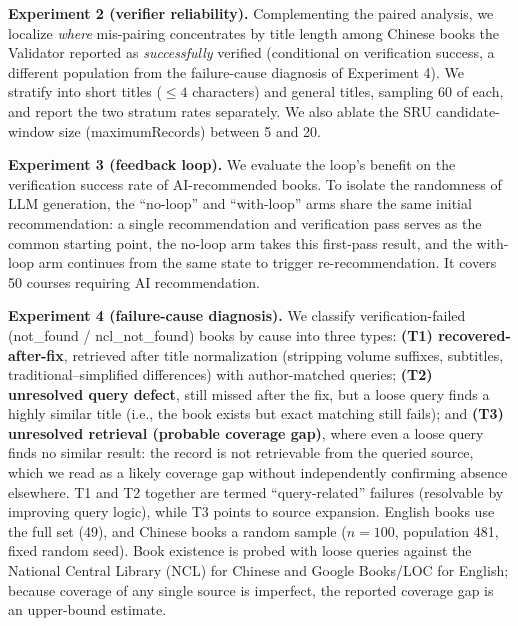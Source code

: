 \documentclass[conference]{IEEEtran}
\begin{document}
\textbf{Experiment 2 (verifier reliability).} Complementing the paired analysis,
we localize \emph{where} mis-pairing concentrates by title length among Chinese
books the Validator reported as \emph{successfully} verified (conditional on
verification success, a different population from the failure-cause diagnosis of
Experiment 4). We stratify into short titles ($\leq 4$ characters) and general
titles, sampling 60 of each, and report the two stratum rates separately. We also
ablate the SRU candidate-window size (maximumRecords) between 5 and 20.

\textbf{Experiment 3 (feedback loop).} We evaluate the loop's benefit on the
verification success rate of AI-recommended books. To isolate the randomness of
LLM generation, the ``no-loop'' and ``with-loop'' arms share the same initial
recommendation: a single recommendation and verification pass serves as the
common starting point, the no-loop arm takes this first-pass result, and the
with-loop arm continues from the same state to trigger re-recommendation. It
covers 50 courses requiring AI recommendation.

\textbf{Experiment 4 (failure-cause diagnosis).} We classify
verification-failed (not\_found / ncl\_not\_found) books by cause into three
types: \textbf{(T1) recovered-after-fix}, retrieved after title normalization
(stripping volume suffixes, subtitles, traditional--simplified differences)
with author-matched queries; \textbf{(T2) unresolved query defect}, still
missed after the fix, but a loose query finds a highly similar title (i.e., the
book exists but exact matching still fails); and \textbf{(T3) unresolved
retrieval (probable coverage gap)}, where even a loose query finds no similar
result: the record is not retrievable from the queried source, which we read as
a likely coverage gap without independently confirming absence elsewhere. T1
and T2 together are termed ``query-related'' failures (resolvable by improving
query logic), while T3 points to source expansion. English books use the full
set (49), and Chinese books a random sample ($n=100$, population 481, fixed
random seed). Book existence is probed with loose queries against the National
Central Library (NCL) for Chinese and Google Books/LOC for English; because
coverage of any single source is imperfect, the reported coverage gap is an
upper-bound estimate.
\end{document}
